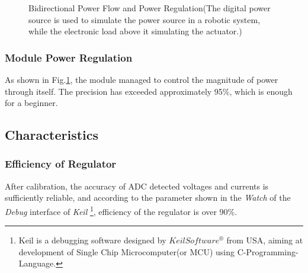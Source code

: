 \documentclass[a4paper,num-refs]{oup-contemporary}
\begin{document}
\begin{figure}[!bp]
\begin{minipage}[t]{0.6\linewidth}
{\begin{minipage}[t]{0.4\linewidth}
	\end{minipage}
}
\hfill
{}
	\centering
	\caption{Bidirectional Power Flow and Power Regulation(The digital power source is used to simulate the power source in a robotic system, while the electronic load above it simulating the actuator.)}
	\label{Performance}
\end{minipage}
\end{figure}

\subsubsection{Module Power Regulation}
As shown in Fig.\ref{Performance}, the module managed to control the magnitude of power through itself. The precision has exceeded approximately 95\%, which is enough for a beginner.

\subsection{Characteristics}

\subsubsection{Efficiency of Regulator}
After calibration, the accuracy of ADC detected voltages and currents is sufficiently reliable, and according to the parameter shown in the \textit{Watch} of the \textit{Debug} interface of \textit{Keil} \footnote{Keil is a debugging software designed by $ Keil Software^{\circledR} $ from USA, aiming at development of Single Chip Microcomputer(or MCU) using C-Programming-Language.}, efficiency of the regulator is over 90\%.
\end{document}
